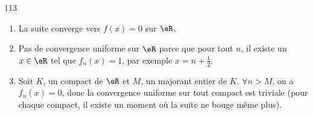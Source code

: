 

\begin{corrige}{113}

    
%

\begin{enumerate}
\item La suite converge vers $f(x)=0$ sur $\eR$.
\item Pas de convergence uniforme sur $\eR$ parce que pour tout $n$, il existe un $x\in\eR$ tel que $f_n(x)=1$, par exemple $x=n+\frac{ 1 }{2}$.
\item Soit $K$, un compact de $\eR$ et $M$, un majorant entier de $K$. $\forall n>M$, on a $f_n(x)=0$, donc la convergence uniforme sur tout compact est triviale (pour chaque compact, il existe un moment où la suite ne bouge même plus).
\end{enumerate}

\end{corrige}
